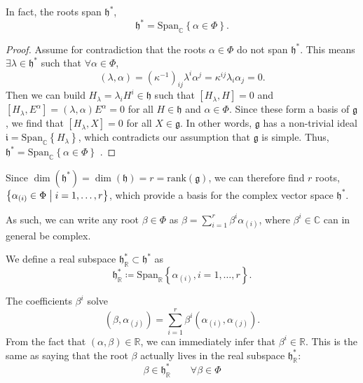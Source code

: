 \begin{claim}
  In fact, the roots span $\mathfrak{h}^*$,
  \begin{equation}
    \mathfrak{h}^* = \text{Span}_{\mathbb{C}}\left\{\alpha \in \Phi\right\}.
  \end{equation}
\end{claim}
\begin{proof}
  Assume for contradiction that the roots $\alpha \in \Phi$ do not span $\mathfrak{h}^*$. This means $\exists \lambda \in \mathfrak{h}^*$ such that $\forall \alpha \in \Phi$, 
  \begin{equation}
    (\lambda, \alpha) = (\kappa^{-1})_{ij} \lambda^{i} \alpha^{j} = \kappa^{ij} \lambda_{i} \alpha_{j} = 0.
  \end{equation}
  Then we can build $H_{\lambda} = \lambda_{i} H^{i} \in \mathfrak{h}$ such that $ [H_{\lambda}, H] = 0$ and $[H_{\lambda}, E^{\alpha}] = (\lambda, \alpha) E^{\alpha} = 0$ for all $H \in \mathfrak{h}$ and $\alpha \in \Phi$.
  Since these form a basis of $\mathfrak{g}$, we find that $[H_{\lambda}, X] = 0$ for all $X \in \mathfrak{g}$.
  In other words, $\mathfrak{g}$ has a non-trivial ideal $\mathfrak{i} = \text{Span}_{\mathbb{C}}\left\{H_{\lambda}\right\}$, which contradicts our assumption that $\mathfrak{g}$ is simple.
  Thus, $\mathfrak{h}^* = \text{Span}_{\mathbb{C}}\left\{\alpha \in \Phi\right\}$ .
\end{proof}

\begin{corollary}
  Since $\dim(\mathfrak{h}^*) = \dim(\mathfrak{h}) = r = \text{rank}(\mathfrak{g})$, we can therefore find $r$ roots, $\left\{ \alpha_{(i)} \in \Phi \suchthat i = 1, \dots, r \right\}$, which provide a basis for the complex vector space $\mathfrak{h}^*$.
\end{corollary}
As such, we can write any root $\beta \in \Phi$ as $\beta = \sum_{i=1}^{r} \beta^{i} \alpha_{(i)}$, where $\beta^{i} \in \mathbb{C}$ can in general be complex.
\begin{definition}[]
  We define a real subspace $\mathfrak{h}^*_{\mathbb{R}} \subset \mathfrak{h}^*$ as
  \begin{equation}
    \mathfrak{h}^*_{\mathbb{R}} \coloneqq \text{Span}_{\mathbb{R}}\left\{ \alpha_{(i)}, i = 1, \dots, r\right\}.
  \end{equation}
\end{definition}
The coefficients $\beta^i $ solve
\begin{equation}
  (\beta, \alpha_{(j)}) = \sum_{i=1}^{r} \beta^i (\alpha_{(i)}, \alpha_{(j)}).
\end{equation}
From the fact that $(\alpha, \beta) \in \mathbb{R}$, we can immediately infer that $\beta^i \in \mathbb{R}$.
This is the same as saying that the root $\beta$ actually lives in the real subspace $\mathfrak{h}^*_{\mathbb{R}}$:
\begin{equation}
  \boxed{\beta \in \mathfrak{h}^*_{\mathbb{R}} \qquad \forall\beta \in \Phi}
\end{equation}

